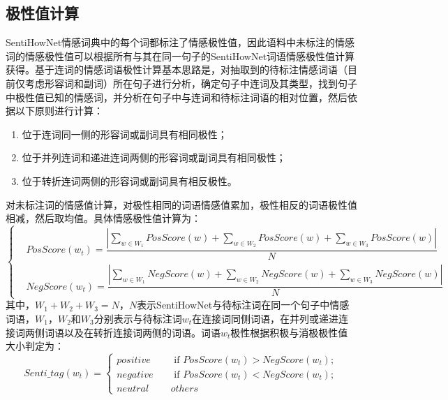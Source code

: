 \subsection{极性值计算}
SentiHowNet情感词典中的每个词都标注了情感极性值，因此语料中未标注的情感词的情感极性值可以根据所有与其在同一句子的SentiHowNet词语情感极性值计算获得。基于连词的情感词语极性计算基本思路是，对抽取到的待标注情感词语（目前仅考虑形容词和副词）所在句子进行分析，确定句子中连词及其类型，找到句子中极性值已知的情感词，并分析在句子中与连词和待标注词语的相对位置，然后依据以下原则进行计算：
\begin{enumerate}
\item 位于连词同一侧的形容词或副词具有相同极性；
\item 位于并列连词和递进连词两侧的形容词或副词具有相同极性；
\item 位于转折连词两侧的形容词或副词具有相反极性。
\end{enumerate}
对未标注词的情感值计算，对极性相同的词语情感值累加，极性相反的词语极性值相减，然后取均值。具体情感极性值计算为：
\begin{equation}
\begin{cases}
& PosScore(w_t)=\dfrac{|\sum_{w \in W_1}PosScore(w)+\sum_{w \in W_2}PosScore(w)+\sum_{w \in W_3}PosScore(w)|}{N} \\
& NegScore(w_t)=\dfrac{|\sum_{w \in W_1}NegScore(w)+\sum_{w \in W_2}NegScore(w)+\sum_{w \in W_3}NegScore(w)|}{N}
\end{cases}
\end{equation}
其中，$W_1+W_2+W_3=N$，$N$表示SentiHowNet与待标注词在同一个句子中情感词语，$W_1$，$W_2$和$W_3$分别表示与待标注词$w_t$在连接词同侧词语，在并列或递进连接词两侧词语以及在转折连接词两侧的词语。词语$w_t$极性根据积极与消极极性值大小判定为：
\begin{equation}
\label{eq3-2}
Senti\_tag(w_t)=
\begin{cases}
 positive \quad & \text{ if } PosScore(w_t)> NegScore(w_t); \\ 
 negative \quad &\text{ if } PosScore(w_t)< NegScore(w_t);  \\ 
 neutral  \quad & others
\end{cases}
\end{equation}

